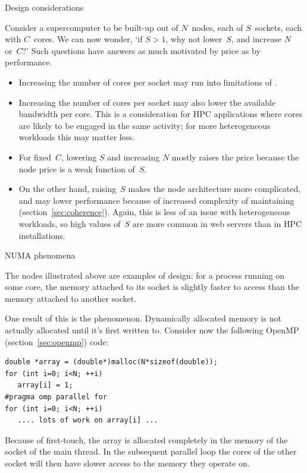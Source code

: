  {Design considerations}

Consider a supercomputer 
to be built-up out of $N$~nodes, each of $S$~sockets,
each with $C$~cores. 
We can now wonder, `if $S>1$, why not lower~$S$,
and increase $N$ or~$C$?'
Such questions have answers as much motivated by price as by performance.
\begin{itemize}
\item Increasing the number of cores per socket may run into
  limitations of .
\item Increasing the number of cores per socket may also
  lower the available bandwidth per core.
  This is a consideration for \ac{HPC} applications where
  cores are likely to be engaged in the same activity;
  for more heterogeneous workloads this may matter less.
\item For fixed~$C$, lowering $S$ and increasing $N$ mostly raises
  the price because the node price is a weak function of~$S$.
\item On the other hand, raising~$S$ makes the node architecture
  more complicated, and may lower performance because of
  increased complexity of maintaining 
  (section~\ref{sec:coherence}).
  Again, this is less of an issue with heterogeneous workloads,
  so high values of~$S$ are more common in web servers than
  in \ac{HPC} installations.
\end{itemize}

 {NUMA phenomena}

The nodes illustrated above are examples of  design:
for a process running on some core,
the memory attached to its socket is slightly faster to
access than the memory attached to another socket.

One result of this is the  phenomenon.
Dynamically allocated memory is not actually allocated until it's
first written to. Consider now the following OpenMP
(section~\ref{sec:openmp}) code:
\begin{lstlisting}
double *array = (double*)malloc(N*sizeof(double));
for (int i=0; i<N; ++i)
   array[i] = 1;
#pragma omp parallel for
for (int i=0; i<N; ++i)
   .... lots of work on array[i] ...
\end{lstlisting}
Because of first-touch, the array is allocated completely in the
memory of the socket of the main thread.
In the subsequent parallel
loop the cores of the other socket will then have slower access to the
memory they operate on.

